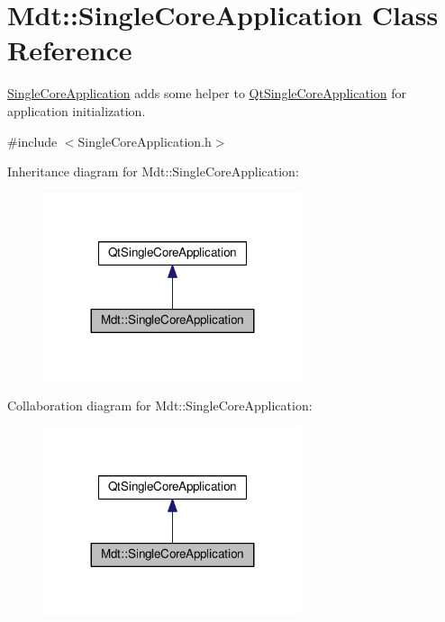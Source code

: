 \hypertarget{class_mdt_1_1_single_core_application}{}\section{Mdt\+:\+:Single\+Core\+Application Class Reference}
\label{class_mdt_1_1_single_core_application}


\hyperlink{class_mdt_1_1_single_core_application}{Single\+Core\+Application} adds some helper to \hyperlink{class_qt_single_core_application}{Qt\+Single\+Core\+Application} for application initialization.  




{\ttfamily \#include $<$Single\+Core\+Application.\+h$>$}



Inheritance diagram for Mdt\+:\+:Single\+Core\+Application\+:
\nopagebreak
\begin{figure}[H]
\begin{center}
\leavevmode
\includegraphics[width=215pt]{class_mdt_1_1_single_core_application__inherit__graph}
\end{center}
\end{figure}


Collaboration diagram for Mdt\+:\+:Single\+Core\+Application\+:
\nopagebreak
\begin{figure}[H]
\begin{center}
\leavevmode
\includegraphics[width=215pt]{class_mdt_1_1_single_core_application__coll__graph}
\end{center}
\end{figure}
